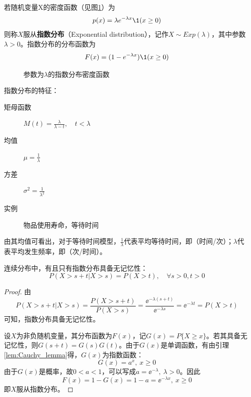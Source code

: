 \begin{definition}
    若随机变量X的密度函数（见图\ref{fig:exponential_pdf}）为
    \[ p(x) = \lambda e^{-\lambda x} \1(x \ge 0) \]
    则称$X$服从\textbf{指数分布}（Exponential distribution），记作$X\sim Exp(\lambda)$，其中参数$\lambda>0$。指数分布的分布函数为
    \[ F(x) = (1 - e^{-\lambda x})\1(x \ge 0) \]
\end{definition}

\begin{figure}[!ht]
    \centering
    \caption{参数为$\lambda$的指数分布密度函数}\label{fig:exponential_pdf}
\end{figure}

指数分布的特征：
\begin{description}
    \item[矩母函数] $M(t)=\frac{\lambda}{\lambda-t} , \quad t < \lambda$
    \item[均值] $\mu=\frac{1}{\lambda}$
    \item[方差] $\sigma^2=\frac{1}{\lambda^{2}}$
    \item[实例] 物品使用寿命，等待时间
\end{description}

\begin{remark}
    由其均值可看出，对于等待时间模型，$\frac{1}{\lambda}$代表平均等待时间，即（时间/次）；$\lambda$代表平均发生频率，即（次/时间）。
\end{remark}

\begin{theorem}[指数分布的无记忆性]
    连续分布中，有且只有指数分布具备无记忆性：
    \[ P(X > s + t| X > s) = P( X > t) ,\quad \forall s>0,t>0\]
\end{theorem}
\begin{proof}
    由
    \[ P(X>s+t | X>s) = \frac{P(X>s+t)}{P(X>s)} = \frac{\ee^{-\lambda(s+t)}}{\ee^{-\lambda s}} = \ee^{-\lambda t} =P(X>t) \]
    可知，指数分布具备无记忆性。

    设$X$为非负随机变量，其分布函数为$F(x)$，记$G(x)=P\{ X\ge x \}$。若其具备无记忆性，则$G(s+t)=G(s)G(t)$。由于$G(x)$是单调函数，有由引理\ref{lem:Cauchy_lemma}得，$G(x)$为指数函数：
    \[ G(x)=a^x,\ x\ge 0 \]
    由于$G(x)$是概率，故$0<a<1$，可以写成$a=\ee^{-\lambda},\ \lambda > 0$。因此
    \[ F(x)=1-G(x)=1-a=\ee^{-\lambda x},\ x\ge 0 \]
    即$X$服从指数分布。
\end{proof}

